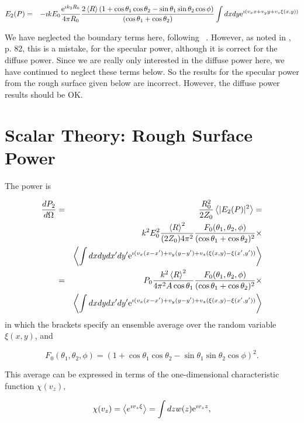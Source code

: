\documentclass[11pt,openany]{report}
\newcommand{\der}[2]{\frac{d {#1}}{d {#2}}}
\newcommand{\e}{{\rm e}}
\begin{document}
{{\begin{eqnarray}
E_{2}(P)&=&-\imath kE_{0}\frac{\e^{\imath k_{2}R_{0}}}{4\pi R_{0}}\frac{2\left<R\right>\left(1+\cos\theta_{1}\cos\theta_{2}-\sin\theta_{1}\sin\theta_{2}\cos\phi\right)}{(\cos{\theta_{1}}+\cos{\theta_{2}})}\int dx dy\e^{\imath( v_{x}x+v_{y}y+v_{z}\xi(x,y))}
\end{eqnarray}

We have neglected the boundary terms here, following
~\cite{b:beckmann}. However, as noted in \cite{b:ogilvy}, p. 82, this is a
mistake, for the specular power, although it is correct for the
diffuse power. Since we are really only interested in the diffuse
power here, we have continued to neglect these terms below. So the
results for the specular power from the rough surface given below are
incorrect. However, the diffuse power results should be OK.

\section{Scalar Theory: Rough Surface Power} 

The power is

\begin{eqnarray}
\der{P_{2}}{\Omega}&=&\frac{R_{0}^{2}}{2Z_{0}}\left<|E_{2}(P)|^{2}\right>=\\
&&k^{2}E_{0}^{2}\frac{\left<R\right>^{2}}{(2Z_{0})4\pi^{2}}\frac{F_{0}(\theta_{1},\theta_{2},\phi)}{(\cos{\theta_{1}}+\cos{\theta_{2}})^{2}}\times\\
&&\left<\int dx dydx'dy'\e^{\imath( v_{x}(x-x')+v_{y}(y-y')+v_{z}(\xi(x,y)-\xi(x',y'))}\right>\\
&=&P_{0}\frac{k^{2}\left<R\right>^{2}}{4\pi^{2}A\cos\theta_{1}}\frac{F_{0}(\theta_{1},\theta_{2},\phi)}{(\cos{\theta_{1}}+\cos{\theta_{2}})^{2}}\times\\
&&\left<\int dx dydx'dy'\e^{\imath( v_{x}(x-x')+v_{y}(y-y')+v_{z}(\xi(x,y)-\xi(x',y'))}\right>\end{eqnarray}
in which the brackets specify an ensemble average over the random variable $\xi(x,y)$, and

$$F_{0}(\theta_{1},\theta_{2},\phi)=\left(1+\cos\theta_{1}\cos\theta_{2}-\sin\theta_{1}\sin\theta_{2}\cos\phi\right)^{2}.$$

This average can be expressed in terms of the one-dimensional characteristic function $\chi(v_{z}),$

$$\chi(v_{z})=\left<e^{\imath v_{z}\xi}\right>=\int dz w(z) \e^{\imath v_{z}z},$$

}}
\end{document}
